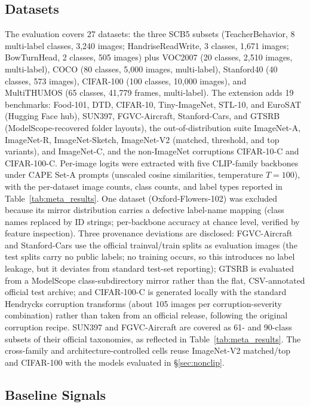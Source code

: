 \documentclass[a4paper,fleqn]{cas-sc}
\newcommand{\scbfive}{\textsc{SCB5}}
\begin{document}
\subsection{Datasets}
\label{sec:datasets}
The evaluation covers 27 datasets: the three \scbfive{} subsets (TeacherBehavior, 8 multi-label classes, 3,240 images; HandriseReadWrite, 3 classes, 1,671 images; BowTurnHead, 2 classes, 505 images) plus VOC2007 (20 classes, 2,510 images, multi-label), COCO (80 classes, 5,000 images, multi-label), Stanford40 (40 classes, 573 images), CIFAR-100 (100 classes, 10,000 images), and MultiTHUMOS (65 classes, 41,779 frames, multi-label).
The extension adds 19 benchmarks: Food-101, DTD, CIFAR-10, Tiny-ImageNet, STL-10, and EuroSAT (Hugging Face hub), SUN397, FGVC-Aircraft, Stanford-Cars, and GTSRB (ModelScope-recovered folder layouts), the out-of-distribution suite ImageNet-A, ImageNet-R, ImageNet-Sketch, ImageNet-V2 (matched, threshold, and top variants), and ImageNet-C, and the non-ImageNet corruptions CIFAR-10-C and CIFAR-100-C.
Per-image logits were extracted with five CLIP-family backbones under CAPE Set-A prompts (unscaled cosine similarities, temperature $T{=}100$), with the per-dataset image counts, class counts, and label types reported in Table~\ref{tab:meta_results}.
One dataset (Oxford-Flowers-102) was excluded because its mirror distribution carries a defective label-name mapping (class names replaced by ID strings; per-backbone accuracy at chance level, verified by feature inspection).
Three provenance deviations are disclosed: FGVC-Aircraft and Stanford-Cars use the official trainval/train splits as evaluation images (the test splits carry no public labels; no training occurs, so this introduces no label leakage, but it deviates from standard test-set reporting); GTSRB is evaluated from a ModelScope class-subdirectory mirror rather than the flat, CSV-annotated official test archive; and CIFAR-100-C is generated locally with the standard Hendrycks corruption transforms (about 105 images per corruption-severity combination) rather than taken from an official release, following the original corruption recipe. SUN397 and FGVC-Aircraft are covered as 61- and 90-class subsets of their official taxonomies, as reflected in Table~\ref{tab:meta_results}.
The cross-family and architecture-controlled cells reuse ImageNet-V2 matched/top and CIFAR-100 with the models evaluated in \S\ref{sec:nonclip}.

\subsection{Baseline Signals}
\end{document}
